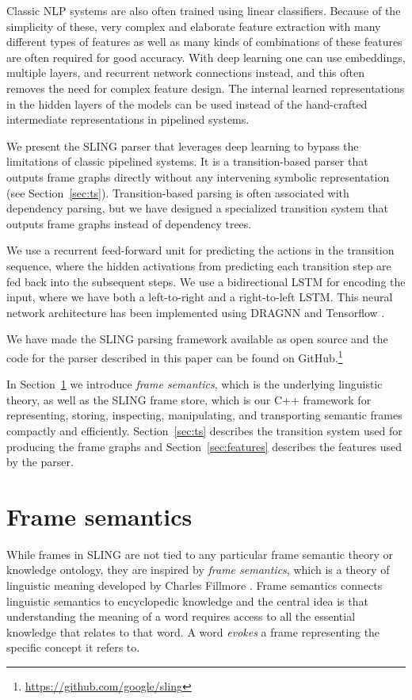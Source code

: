 \documentclass[11pt,a4paper]{article}
\begin{document}
Classic NLP systems are also often trained using linear classifiers.
Because of the simplicity of these, very complex and elaborate feature
extraction with many different types of features as well as many kinds
of combinations of these features are often required for good accuracy.
With deep learning one can use embeddings, multiple layers, and recurrent
network connections instead, and this often removes the need for complex
feature design. The internal learned representations in the hidden layers of
the models can be used instead of the hand-crafted intermediate representations
in pipelined systems.

We present the SLING parser that leverages deep learning to bypass the limitations
of classic pipelined systems.  It is a
transition-based parser that outputs frame graphs directly without any
intervening symbolic representation (see Section~\ref{sec:ts}). Transition-based
parsing is often associated with dependency parsing, but we have designed a
specialized transition system that outputs frame graphs instead of dependency
trees.

We use a recurrent feed-forward unit for predicting the actions in the
transition sequence, where the hidden activations from predicting each transition
step are fed back into the subsequent steps.
We use a bidirectional LSTM for encoding the input, where we have both a
left-to-right and a right-to-left LSTM. This neural network architecture
has been implemented using DRAGNN \cite{dragnn} and Tensorflow \cite{tensorflow}.

We have made the SLING parsing framework available as open source and the code
for the parser described in this paper can be found on GitHub.\footnote{\url{https://github.com/google/sling}}

In Section~\ref{sec:framesem} we introduce \emph{frame semantics}, which is the
underlying linguistic theory, as well as the SLING frame store, which is our
C++ framework for representing, storing, inspecting, manipulating, and
transporting semantic frames compactly and efficiently.
Section~\ref{sec:ts} describes the transition system used for producing the
frame graphs and Section~\ref{sec:features} describes the features used by the parser.

\section{Frame semantics}
\label{sec:framesem}

While frames in SLING are not tied to any particular frame semantic theory or
knowledge ontology, they are inspired by \emph{frame semantics}, which is a
theory of linguistic meaning developed by Charles Fillmore \cite{fillmore1982}.
Frame semantics connects linguistic semantics to encyclopedic knowledge and the
central idea is that understanding the meaning of a word requires access to all
the essential knowledge that relates to that word. A word \emph{evokes} a frame
representing the specific concept it refers to.
\end{document}
